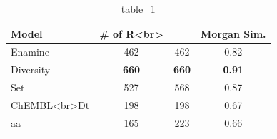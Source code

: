 \begin{table}[t]
\centering
\caption{table_1}
\label{tab:2503.12602}
\begin{tabular}{lccc}
\toprule
Model & # of R<br> &  & Morgan Sim. \\
\midrule
Enamine & 462 & 462 & 0.82 \\
Diversity & \textbf{660} & \textbf{660} & \textbf{0.91} \\
Set & 527 & 568 & 0.87 \\
ChEMBL<br>Dt & 198 & 198 & 0.67 \\
aa & 165 & 223 & 0.66 \\
\bottomrule
\end{tabular}
\end{table}

